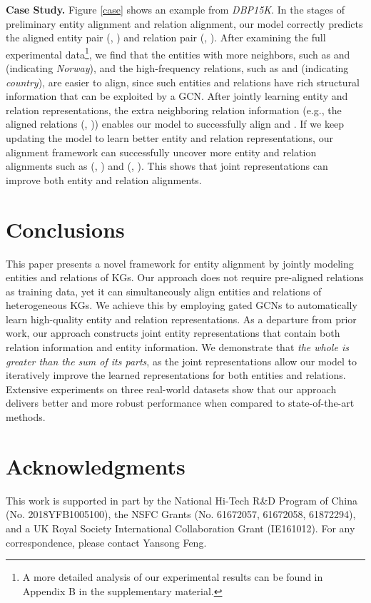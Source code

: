 \documentclass[11pt,a4paper]{article}
\newcommand\cparagraph[1]{\vspace{1mm}\noindent\textbf{#1.}}
\begin{document}
\cparagraph{Case Study}
Figure \ref{case} shows an example from \textit{DBP15K}. In the stages of preliminary entity alignment and relation alignment,
our model correctly predicts the aligned entity pair (, ) and relation pair (, ). After examining the full experimental
data\footnote{A more detailed analysis of our experimental results can be found in Appendix B in the supplementary material.},
we find that the entities with more neighbors, such as  and  (indicating \emph{Norway}), and the high-frequency relations, such
as  and  (indicating \emph{country}), are easier to align, since such entities and relations have rich structural information
that can be exploited by a GCN. After jointly learning entity and relation representations, the extra neighboring relation information (e.g., the aligned relations (, )) enables our model to successfully align  and . If we keep updating the model to learn better entity and relation representations, our alignment framework can successfully uncover
more entity and relation alignments such as (, ) and (, ). This shows that joint representations can improve both entity and relation alignments.




\section{Conclusions}

This paper presents a novel framework for entity alignment by jointly modeling entities and relations of KGs.
Our approach does not require pre-aligned relations as training data, yet it can simultaneously align entities and relations
of heterogeneous KGs. We achieve this by employing gated GCNs to automatically learn high-quality entity and relation
representations. As a departure from prior work, our approach
constructs joint entity representations that contain both relation information and entity information. We demonstrate that \textit{the
	whole is greater than the sum of its parts}, as the joint representations allow our model to iteratively improve the
learned representations for both entities and relations. Extensive experiments on three real-world datasets show
that our approach delivers better and more robust performance when compared to state-of-the-art methods.



\section*{Acknowledgments}
This work is supported in part by the National Hi-Tech R\&D Program of China (No. 2018YFB1005100), the NSFC Grants (No. 61672057, 61672058, 61872294), and a UK Royal Society International Collaboration Grant (IE161012). For any correspondence, please contact Yansong Feng.
\end{document}
